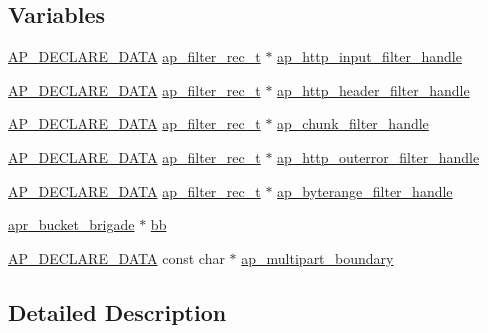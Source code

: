 \subsection*{Variables}
\begin{DoxyCompactItemize}
\item 
\hyperlink{ap__config_8h_a0bb4c3adf74510a0dcdad5b125725fe0}{A\+P\+\_\+\+D\+E\+C\+L\+A\+R\+E\+\_\+\+D\+A\+TA} \hyperlink{structap__filter__rec__t}{ap\+\_\+filter\+\_\+rec\+\_\+t} $\ast$ \hyperlink{group__MOD__CORE_gaeb746d5b6cdbaa812be4a7f25430cc02}{ap\+\_\+http\+\_\+input\+\_\+filter\+\_\+handle}
\item 
\hyperlink{ap__config_8h_a0bb4c3adf74510a0dcdad5b125725fe0}{A\+P\+\_\+\+D\+E\+C\+L\+A\+R\+E\+\_\+\+D\+A\+TA} \hyperlink{structap__filter__rec__t}{ap\+\_\+filter\+\_\+rec\+\_\+t} $\ast$ \hyperlink{group__MOD__CORE_gaa26a8ba27d83d5164e081376e7194a6b}{ap\+\_\+http\+\_\+header\+\_\+filter\+\_\+handle}
\item 
\hyperlink{ap__config_8h_a0bb4c3adf74510a0dcdad5b125725fe0}{A\+P\+\_\+\+D\+E\+C\+L\+A\+R\+E\+\_\+\+D\+A\+TA} \hyperlink{structap__filter__rec__t}{ap\+\_\+filter\+\_\+rec\+\_\+t} $\ast$ \hyperlink{group__MOD__CORE_ga3b05beb1e35eee549854391adb4cb208}{ap\+\_\+chunk\+\_\+filter\+\_\+handle}
\item 
\hyperlink{ap__config_8h_a0bb4c3adf74510a0dcdad5b125725fe0}{A\+P\+\_\+\+D\+E\+C\+L\+A\+R\+E\+\_\+\+D\+A\+TA} \hyperlink{structap__filter__rec__t}{ap\+\_\+filter\+\_\+rec\+\_\+t} $\ast$ \hyperlink{group__MOD__CORE_ga02a4c6ebf534dacd08a261efad19617f}{ap\+\_\+http\+\_\+outerror\+\_\+filter\+\_\+handle}
\item 
\hyperlink{ap__config_8h_a0bb4c3adf74510a0dcdad5b125725fe0}{A\+P\+\_\+\+D\+E\+C\+L\+A\+R\+E\+\_\+\+D\+A\+TA} \hyperlink{structap__filter__rec__t}{ap\+\_\+filter\+\_\+rec\+\_\+t} $\ast$ \hyperlink{group__MOD__CORE_ga7c86a5a40f67a4667c007899293a08d7}{ap\+\_\+byterange\+\_\+filter\+\_\+handle}
\item 
\hyperlink{structapr__bucket__brigade}{apr\+\_\+bucket\+\_\+brigade} $\ast$ \hyperlink{group__MOD__CORE_ga0b0eadb381dbe958da483f3d9fc9521a}{bb}
\item 
\hyperlink{ap__config_8h_a0bb4c3adf74510a0dcdad5b125725fe0}{A\+P\+\_\+\+D\+E\+C\+L\+A\+R\+E\+\_\+\+D\+A\+TA} const char $\ast$ \hyperlink{group__MOD__CORE_gab5961ea801f827be5ef4dd64da4bfbc3}{ap\+\_\+multipart\+\_\+boundary}
\end{DoxyCompactItemize}


\subsection{Detailed Description}


